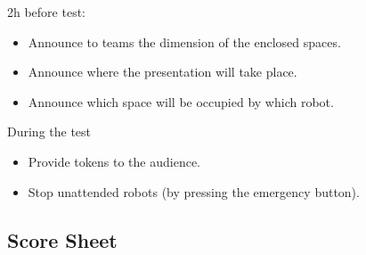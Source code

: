 2h before test:
\begin{itemize}
\item Announce to teams the dimension of the enclosed spaces.
\item Announce where the presentation will take place.
\item Announce which space will be occupied by which robot.
\end{itemize}

During the test
\begin{itemize}
\item Provide tokens to the audience.
\item Stop unattended robots (by pressing the emergency button).
\end{itemize}

\subsection{Score Sheet}




